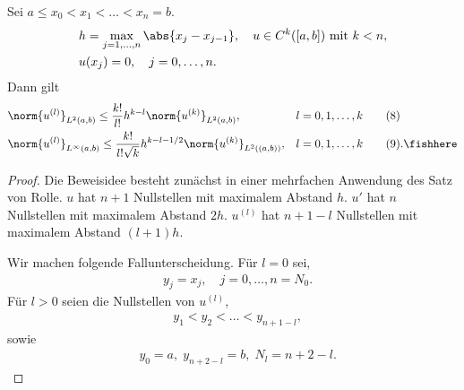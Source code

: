 \begin{prop}
\label{prop:3.7}
Sei $a\le x_0 < x_1 < \ldots < x_n = b$.
\begin{align*}
&h = \max\limits_{j=1,\ldots,n} \abs{x_j - x_{j-1}},\quad u \in C^k([a,b])
\text{ mit }k < n,\\
&u(x_j) = 0,\quad j = 0,\ldots,n.
\end{align*}
Dann gilt
\begin{align*}
&\norm{u^{(l)}}_{L^2(a,b)} \le \frac{k!}{l!}h^{k-l}\norm{u^{(k)}}_{L^2(a,b)},
&&l = 0,1,\ldots,k\tag{8}\\
&\norm{u^{(l)}}_{L^\infty(a,b)} \le
\frac{k!}{l!\sqrt{k}}h^{k-l-1/2}\norm{u^{(k)}}_{L^2((a,b))},&& l
=0,1,\ldots,k\tag{9}.\fishhere
\end{align*}
\end{prop}
\begin{proof}
Die Beweisidee besteht zunächst in einer mehrfachen Anwendung des Satz von
Rolle. $u$ hat $n+1$ Nullstellen mit maximalem Abstand $h$. $u'$ hat $n$
Nullstellen mit maximalem Abstand $2h$. $u^{(l)}$ hat $n+1-l$ Nullstellen mit
maximalem Abstand $(l+1)h$.

Wir machen folgende Fallunterscheidung. Für $l=0$ sei,
\begin{align*}
&y_j = x_j,\quad j=0,\ldots,n = N_0.
\end{align*}
Für $l>0$ seien die Nullstellen von $u^{(l)}$,
\begin{align*}
&y_1 < y_2 < \ldots < y_{n+1-l},
\end{align*}
sowie
\begin{align*}
&y_0 = a,\; y_{n+2-l} = b,\; N_l = n+2-l.
\end{align*}


\end{proof}
